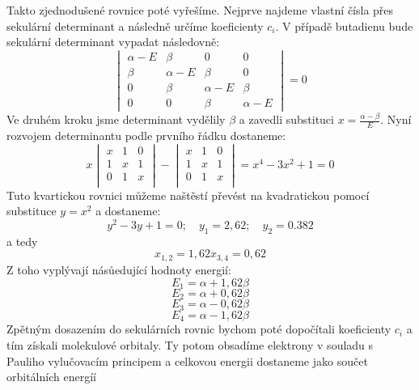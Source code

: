 Takto zjednodušené rovnice poté vyřešíme. Nejprve najdeme vlastní čísla přes sekulární determinant a následně určíme koeficienty $c_i$. V případě butadienu bude sekulární determinant vypadat následovně:
\begin{equation}
\begin{vmatrix}
\alpha-E & \beta & 0 & 0  \\
\beta &\alpha-E & \beta & 0  \\
0 &\beta &\alpha-E & \beta  \\
0 & 0 & \beta &\alpha-E   
\end{vmatrix}
= 0
\end{equation}
Ve druhém kroku jsme determinant vydělily $\beta$ a zavedli substituci $x=\frac{\alpha-\beta}{E}$.
Nyní rozvojem determinantu podle prvního řádku dostaneme:
\begin{equation}
x
\begin{vmatrix}
x & 1 & 0 \\
1 & x & 1 \\
0 & 1 & x \\
\end{vmatrix}
-
\begin{vmatrix}
x & 1 & 0 \\
1 & x & 1 \\
0 & 1 & x \\
\end{vmatrix}
=x^4-3x^2+1=0
\end{equation}
Tuto kvartickou rovnici můžeme naštěstí převést na kvadratickou pomocí substituce $y=x^2$ a dostaneme:
\begin{equation}
y^2-3y+1=0;\quad y_1=2,62;\quad y_2=0.382
\end{equation}
a tedy
\begin{equation}
x_{1,2}=1,62 \nonumber
x_{3,4}=0,62 \nonumber
\end{equation}
Z toho vyplývají násůedující hodnoty energií:
$$ E_1 = \alpha+1,62\beta $$
$$ E_2 = \alpha+0,62\beta $$
$$ E_3 = \alpha-0,62\beta $$
$$ E_4 = \alpha-1,62\beta $$
Zpětným dosazením do sekulárních rovnic bychom poté dopočítali koeficienty $c_i$ a tím získali molekulové orbitaly. Ty potom obsadíme elektrony v souladu s Pauliho vylučovacím principem a celkovou energii dostaneme jako součet orbitálních energíí 




